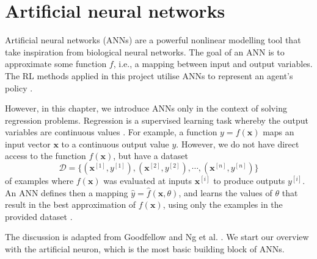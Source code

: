\chapter{Artificial neural networks}\label{chp:anns}

Artificial neural networks (ANNs) are a powerful nonlinear modelling tool that take inspiration from biological neural networks.
The goal of an ANN is to approximate some function $f$, i.e., a mapping between input and output variables.
The RL methods applied in this project utilise ANNs to represent an agent's policy \cite{Fujimoto2018}.


However, in this chapter, we introduce ANNs only in the context of solving regression problems.
Regression is a supervised learning task whereby the output variables are continuous values \cite{Goodfellow2016}.
For example, a function $y=f(\bm{x})$ maps an input vector $\bm{x}$ to a continuous output value $y$.
However, we do not have direct access to the function $f(\bm{x})$, but have a dataset
\begin{equation}\label{eq:supdervised_dataset}
    \mathcal{D} = \{ (\bm{x}^{[1]}, y^{[1]}), (\bm{x}^{[2]}, y^{[2]}), \cdots, (\bm{x}^{[n]}, y^{[n]}) \}
\end{equation}
of examples where $f(\bm{x})$ was evaluated at inputs $\bm{x}^{[i]}$ to produce outputs $y^{[i]}$.
An ANN defines then a mapping $\hat{y}=\hat{f}(\bm{x},\theta)$, and learns the values of $\theta$ that result in the best approximation of $f(\bm{x})$, using only the examples in the provided dataset \cite{Goodfellow2016}.

The discussion is adapted from Goodfellow \cite{Goodfellow2016} and Ng et al. \cite{Ng2019}. 
We start our overview with the artificial neuron, which is the most basic building block of ANNs.


